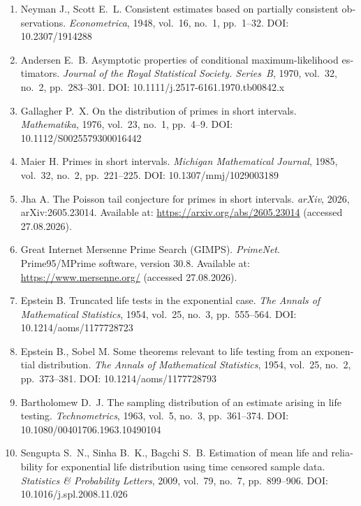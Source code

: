 \documentclass[11pt,a4paper]{article}
\theoremstyle{plain}
\theoremstyle{remark}
\begin{document}
\begin{otherlanguage}{english}
\begin{enumerate}
\item Neyman J., Scott E.~L. Consistent estimates based on partially consistent
observations. \emph{Econometrica}, 1948, vol.~16, no.~1, pp.~1--32.
DOI: 10.2307/1914288

\item Andersen E.~B. Asymptotic properties of conditional maximum-likelihood
estimators. \emph{Journal of the Royal Statistical Society. Series~B}, 1970,
vol.~32, no.~2, pp.~283--301. DOI: 10.1111/j.2517-6161.1970.tb00842.x

\item Gallagher P.~X. On the distribution of primes in short intervals.
\emph{Mathematika}, 1976, vol.~23, no.~1, pp.~4--9.
DOI: 10.1112/S0025579300016442

\item Maier H. Primes in short intervals. \emph{Michigan Mathematical Journal},
1985, vol.~32, no.~2, pp.~221--225. DOI: 10.1307/mmj/1029003189

\item Jha A. The Poisson tail conjecture for primes in short intervals.
\emph{arXiv}, 2026, arXiv:2605.23014. Available at:
\url{https://arxiv.org/abs/2605.23014} (accessed 27.08.2026).

\item Great Internet Mersenne Prime Search (GIMPS). \emph{PrimeNet}.
Prime95/MPrime software, version 30.8. Available at:
\url{https://www.mersenne.org/} (accessed 27.08.2026).

\item Epstein B. Truncated life tests in the exponential case.
\emph{The Annals of Mathematical Statistics}, 1954, vol.~25, no.~3,
pp.~555--564. DOI: 10.1214/aoms/1177728723

\item Epstein B., Sobel M. Some theorems relevant to life testing from an
exponential distribution. \emph{The Annals of Mathematical Statistics}, 1954,
vol.~25, no.~2, pp.~373--381. DOI: 10.1214/aoms/1177728793

\item Bartholomew D.~J. The sampling distribution of an estimate arising in
life testing. \emph{Technometrics}, 1963, vol.~5, no.~3, pp.~361--374.
DOI: 10.1080/00401706.1963.10490104

\item Sengupta S.~N., Sinha B.~K., Bagchi S.~B. Estimation of mean life and
reliability for exponential life distribution using time censored sample data.
\emph{Statistics \& Probability Letters}, 2009, vol.~79, no.~7, pp.~899--906.
DOI: 10.1016/j.spl.2008.11.026


\end{enumerate}
\end{otherlanguage}
\end{document}
